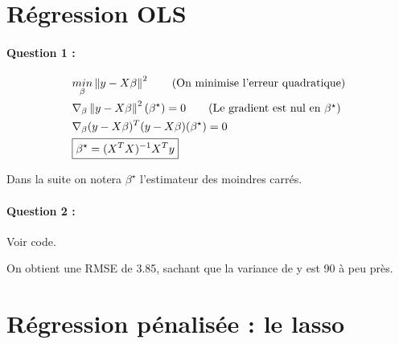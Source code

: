 \documentclass{article}
\newcommand{\norm}[1]{\left\lVert#1\right\rVert^{2}}
\begin{document}





\title{	}


\section{Régression OLS}


\paragraph{Question 1 :}

\begin{align}
&\underset{\beta}{min}\norm{ y - X \beta} \tag{On minimise l'erreur quadratique}
\\ &\nabla_{\beta} \norm{ y - X \beta}(\beta^{\star}) = 0 \tag{Le gradient est nul en $\beta^\star$}
\notag \\ &\nabla_{\beta} ( y - X \beta)^{T} ( y - X \beta) (\beta^{\star}) = 0
\notag \\ &\boxed{\beta^{\star} = (X^{T}X)^{-1}X^{T}y}
\end{align}


Dans la suite on notera $\beta^{\star}$ l'estimateur des moindres carrés.
\paragraph{Question 2 :}

Voir code.

On obtient une RMSE de 3.85, sachant que la variance de y est 90 à peu près.

\section{Régression pénalisée : le lasso}
\end{document}
